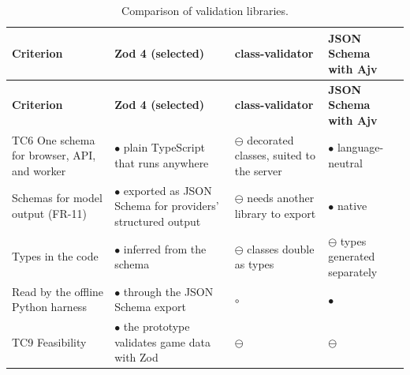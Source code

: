 {\small{}\renewcommand{\arraystretch}{1.1}
\begin{longtable}{|>{\raggedright\arraybackslash}p{}|>{\raggedright\arraybackslash}p{}|>{\raggedright\arraybackslash}p{}|>{\raggedright\arraybackslash}p{}|}
\caption{Comparison of validation libraries.} \\
\hline
\textbf{Criterion} & \textbf{Zod 4 (selected)} & \textbf{class-\allowbreak{}validator\cite{r188}} & \textbf{JSON Schema with Ajv\cite{r189}} \\ \hline
\endfirsthead
\hline
\textbf{Criterion} & \textbf{Zod 4 (selected)} & \textbf{class-\allowbreak{}validator\cite{r188}} & \textbf{JSON Schema with Ajv\cite{r189}} \\ \hline
\endhead
TC6 One schema for browser, API, and worker & $\bullet$ plain TypeScript that runs anywhere & $\ominus$ decorated classes, suited to the server & $\bullet$ language-\allowbreak{}neutral \\ \hline
Schemas for model output (FR-11) & $\bullet$ exported as JSON Schema for providers' structured output\cite{r190} & $\ominus$ needs another library to export & $\bullet$ native \\ \hline
Types in the code & $\bullet$ inferred from the schema & $\ominus$ classes double as types & $\ominus$ types generated separately \\ \hline
Read by the offline Python harness & $\bullet$ through the JSON Schema export & $\circ$ & $\bullet$ \\ \hline
TC9 Feasibility & $\bullet$ the prototype validates game data with Zod & $\ominus$ & $\ominus$ \\ \hline
\end{longtable}
}

